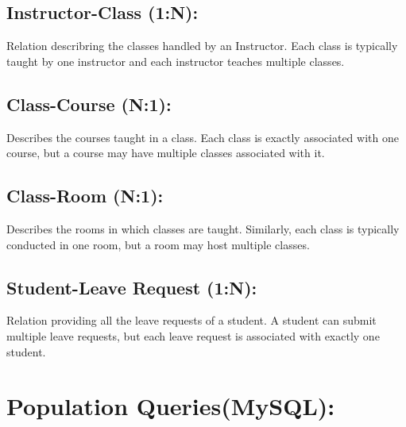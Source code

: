 \documentclass{article}
\begin{document}
\subsection*{Instructor-Class (1:N):}
\begin{large}
Relation describring the classes handled by an Instructor. Each class is typically taught by one instructor and each instructor teaches multiple classes.
\end{large}

\subsection*{Class-Course (N:1):}
\begin{large}
Describes the courses taught in a class. Each class is exactly associated with one course, but a course may have multiple classes associated 
with it.
\end{large}

\subsection*{Class-Room (N:1):}
\begin{large}
Describes the rooms in which classes are taught. Similarly, each class is typically conducted in one room, but a room may host multiple classes.
\end{large}

\subsection*{Student-Leave Request (1:N):}
\begin{large}
Relation providing all the leave requests of a student. A student can submit multiple leave requests, but each leave request is associated with exactly 
one student. 
\end{large}


\newpage
\section*{\huge{Population Queries(MySQL):}}
\end{document}
